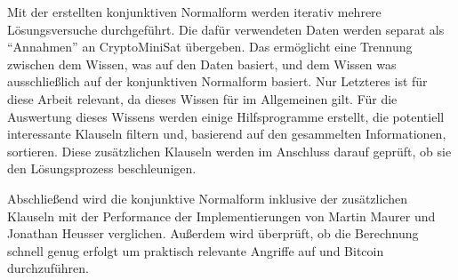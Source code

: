 Mit der erstellten konjunktiven Normalform werden iterativ mehrere Lösungsversuche durchgeführt. Die dafür verwendeten
Daten werden separat als "`Annahmen"' an CryptoMiniSat übergeben. Das ermöglicht eine Trennung zwischen dem Wissen, was
auf den Daten basiert, und dem Wissen was ausschließlich auf der konjunktiven Normalform basiert. Nur Letzteres ist für
diese Arbeit relevant, da dieses Wissen für  im Allgemeinen gilt. Für die Auswertung dieses Wissens werden einige
Hilfsprogramme erstellt, die potentiell interessante Klauseln filtern und, basierend auf den gesammelten Informationen,
sortieren. Diese zusätzlichen Klauseln werden im Anschluss darauf geprüft, ob sie den Lösungsprozess beschleunigen.

Abschließend wird die konjunktive Normalform inklusive der zusätzlichen Klauseln mit der Performance der Implementierungen
von Martin Maurer und Jonathan Heusser verglichen. Außerdem wird überprüft, ob die Berechnung schnell genug erfolgt um
praktisch relevante Angriffe auf  und Bitcoin durchzuführen.
